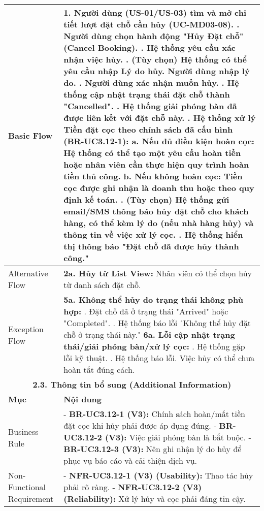 \begin{longtable}{|m{4cm}|p{11cm}|}
Basic Flow & 1. Người dùng (US-01/US-03) tìm và mở chi tiết lượt đặt chỗ cần hủy (UC-MD03-08). \newline 2. Người dùng chọn hành động "Hủy Đặt chỗ" (Cancel Booking). \newline 3. Hệ thống yêu cầu xác nhận việc hủy. \newline 4. (Tùy chọn) Hệ thống có thể yêu cầu nhập Lý do hủy. Người dùng nhập lý do. \newline 5. Người dùng xác nhận muốn hủy. \newline 6. Hệ thống cập nhật trạng thái đặt chỗ thành "Cancelled". \newline 7. Hệ thống giải phóng bàn đã được liên kết với đặt chỗ này. \newline 8. Hệ thống xử lý Tiền đặt cọc theo chính sách đã cấu hình (BR-UC3.12-1): \newline    a. Nếu đủ điều kiện hoàn cọc: Hệ thống có thể tạo một yêu cầu hoàn tiền hoặc nhân viên cần thực hiện quy trình hoàn tiền thủ công. \newline    b. Nếu không hoàn cọc: Tiền cọc được ghi nhận là doanh thu hoặc theo quy định kế toán. \newline 9. (Tùy chọn) Hệ thống gửi email/SMS thông báo hủy đặt chỗ cho khách hàng, có thể kèm lý do (nếu nhà hàng hủy) và thông tin về việc xử lý cọc. \newline 10. Hệ thống hiển thị thông báo "Đặt chỗ đã được hủy thành công." \\
\hline
Alternative Flow & \textbf{2a. Hủy từ List View:} Nhân viên có thể chọn hủy từ danh sách đặt chỗ. \\
\hline
Exception Flow & \textbf{5a. Không thể hủy do trạng thái không phù hợp:} \newline    1. Đặt chỗ đã ở trạng thái "Arrived" hoặc "Completed". \newline    2. Hệ thống báo lỗi "Không thể hủy đặt chỗ ở trạng thái này." \newline \textbf{6a. Lỗi cập nhật trạng thái/giải phóng bàn/xử lý cọc:} \newline    1. Hệ thống gặp lỗi kỹ thuật. \newline    2. Hệ thống báo lỗi. Việc hủy có thể chưa hoàn tất đúng cách. \\
\hline
\multicolumn{2}{|c|}{\textbf{2.3. Thông tin bổ sung (Additional Information)}} \\
\hline
\textbf{Mục} & \textbf{Nội dung} \\
\hline
Business Rule & - \textbf{BR-UC3.12-1 (V3):} Chính sách hoàn/mất tiền đặt cọc khi hủy phải được áp dụng đúng. \newline - \textbf{BR-UC3.12-2 (V3):} Việc giải phóng bàn là bắt buộc. \newline - \textbf{BR-UC3.12-3 (V3):} Nên ghi nhận lý do hủy để phục vụ báo cáo và cải thiện dịch vụ. \\
\hline
Non-Functional Requirement & - \textbf{NFR-UC3.12-1 (V3) (Usability):} Thao tác hủy phải rõ ràng. \newline - \textbf{NFR-UC3.12-2 (V3) (Reliability):} Xử lý hủy và cọc phải đáng tin cậy. \\
\hline
\end{longtable}

